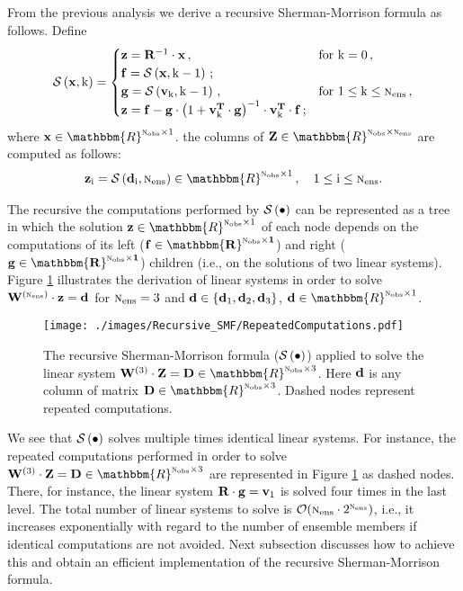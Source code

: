 \documentclass[12pt]{article}
\newcommand{\Nobs}{\textsc{n}_{{\rm obs}}}
\newcommand{\Nens}{\textsc{n}_{{\rm ens}}}
\newcommand{\BO}{{\mathcal O}}
\newcommand{\R}{{\bf R}}
\newcommand{\Z}{{\bf Z}}
\newcommand{\z}[1]{{\bf z}_{{\rm #1}}}
\newcommand{\D}{{\bf D}}
\renewcommand{\d}[1]{{\bf d}_{\rm #1}}
\newcommand{\W}[1]{{{\bf W}^{\left ( {\rm #1} \right )}}}
\renewcommand{\v}[1]{{\bf v}_{{\rm #1}}}
\renewcommand{\Re}{\mathbbm{R}}
\newcommand{\invM}[1]{\left( #1 \right )^{-1}}
\newcommand{\invS}[1]{ {#1^{-1}}}
\newcommand{\x}{{\bf x}}
\newcommand{\fun}[1]{{\cal S}\left(#1 \right )}
\renewcommand{\k}{{\rm k}}
\begin{document}
From the previous analysis we derive a recursive Sherman-Morrison formula as follows. Define
\begin{eqnarray}
\label{EnKSM:recursive-SMF}
\displaystyle \fun{\x,\k} = 
\begin{cases}
{\bf z} = \invS{\R} \cdot \x\,, & \textnormal{for }\k = 0\,, \\
{\bf f} = \fun{\x,\k-1}\,; & \\
{\bf g} = \fun{\v{k},\k-1}\,, & \textnormal{for } 1\le \k \le \Nens\,, \\
{\bf z} = {\bf f}-{\bf g}\cdot \invM{1+\v{k}^{\bf T} \cdot {\bf g}} \cdot \v{k}^{\bf T} \cdot {\bf f}\,;
\end{cases}
\end{eqnarray}
where $\x \in \Re^{\Nobs \times 1}$. the columns of $\Z \in \Re^{\Nobs \times \Nens}$ are computed as follows:
\begin{eqnarray} \nonumber
\displaystyle \z{i} = \fun{\d{i},\Nens} \in \Re^{\Nobs \times 1}\,,\quad 1 \le {\rm i} \le \Nens.
\end{eqnarray}

The recursive the computations performed by $\fun{\bullet}$ can be represented as a tree in which the solution ${\bf z} \in \Re^{\Nobs \times 1}$
 of each node depends on the computations of its left ($\bf f \in \Re^{\Nobs \times 1}$) and right ($\bf g \in \Re^{\Nobs \times 1}$) children (i.e., on the solutions of two linear systems). Figure \ref{Fig:sherman-full} illustrates the derivation of linear systems in order to solve $\W{\Nens} \cdot {\bf z} = {\bf d}$ for $\Nens=3$ and ${\bf d}\in \{ \d{1},\d{2},\d{3} \}$, ${\bf d} \in \Re^{\Nobs \times 1}$.


\begin{figure}[H]
  \centering
	      \texttt{[image: ./images/Recursive\_SMF/RepeatedComputations.pdf]}
  \caption{\label{Fig:sherman-full}The recursive Sherman-Morrison formula ($\fun{\bullet}$) applied to solve the linear system $\W{3} \cdot \Z=\D \in \Re^{\Nobs \times 3}$.   Here ${\bf d}$ is any column of matrix $\D \in \Re^{\Nobs \times 3}$. Dashed nodes represent repeated computations.}
\end{figure}


We see that $\fun{ \bullet}$ solves multiple times identical linear systems. For instance, the repeated computations performed in order to solve $\W{3} \cdot \Z = \D \in \Re^{\Nobs \times 3}$ are represented in Figure \ref{Fig:sherman-full} as dashed nodes. There, for instance, the linear system $\R \cdot {\bf g} = \v{1}$ is solved four times in the last level. The total number of linear systems to solve is $\BO(\Nens \cdot 2^{\Nens})$, i.e., it increases exponentially with regard to the number of ensemble members if identical computations are not avoided. Next subsection discusses how to achieve this and obtain an efficient implementation of the recursive Sherman-Morrison formula.
\end{document}
